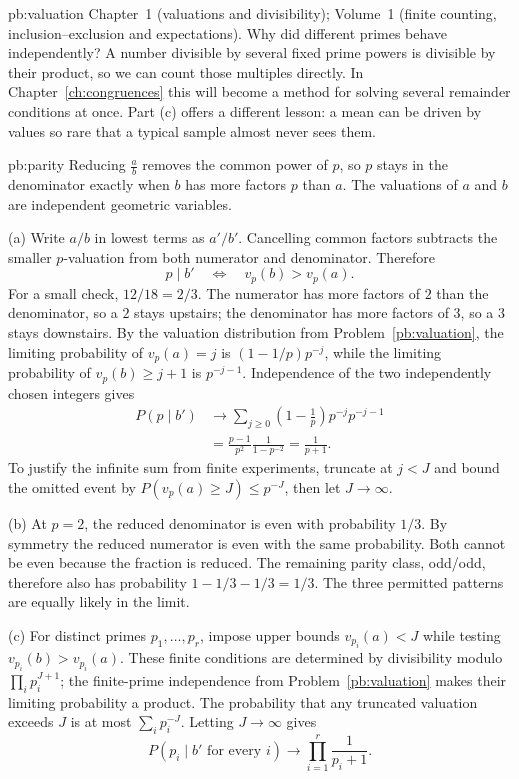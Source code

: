 \begin{solution}{pb:valuation}
\tools Chapter~1 (valuations and divisibility); Volume~1 (finite counting, inclusion--exclusion and expectations).
\leads Why did different primes behave independently? A number divisible by
several fixed prime powers is divisible by their product, so we can
count those multiples directly. In Chapter~\ref{ch:congruences} this
will become a method for solving several remainder conditions at once.
Part (c) offers a different lesson: a mean can be driven by values
so rare that a typical sample almost never sees them.
\end{solution}

\begin{solution}{pb:parity}
\idea Reducing $\frac ab$ removes the common power of $p$, so $p$ stays in the denominator exactly when $b$ has more factors $p$
than $a$. The valuations of $a$ and $b$ are independent geometric variables.

\writeup (a) Write $a/b$ in lowest terms as $a'/b'$. Cancelling common factors subtracts the smaller $p$-valuation from both numerator and denominator. Therefore
\[
p\mid b'\quad\Longleftrightarrow\quad v_p(b)>v_p(a).
\]
For a small check, $12/18=2/3$. The numerator has more factors of $2$ than the denominator, so a $2$ stays upstairs; the denominator has more factors of $3$, so a $3$ stays downstairs.
By the valuation distribution from Problem~\ref{pb:valuation}, the limiting probability of $v_p(a)=j$ is $(1-1/p)p^{-j}$, while the limiting probability of $v_p(b)\ge j+1$ is $p^{-j-1}$. Independence of the two independently chosen integers gives
\[
\begin{aligned}
P(p\mid b')
&\longrightarrow
\sum_{j\ge0}\left(1-\frac1p\right)p^{-j}p^{-j-1}\\
&=\frac{p-1}{p^2}\frac1{1-p^{-2}}
=\frac1{p+1}.
\end{aligned}
\]
To justify the infinite sum from finite experiments, truncate at $j<J$ and bound the omitted event by $P(v_p(a)\ge J)\le p^{-J}$, then let $J\to\infty$.

(b) At $p=2$, the reduced denominator is even with probability $1/3$. By symmetry the reduced numerator is even with the same probability. Both cannot be even because the fraction is reduced. The remaining parity class, odd/odd, therefore also has probability $1-1/3-1/3=1/3$. The three permitted patterns are equally likely in the limit.

(c) For distinct primes $p_1,\ldots,p_r$, impose upper bounds $v_{p_i}(a)<J$ while testing $v_{p_i}(b)>v_{p_i}(a)$. These finite conditions are determined by divisibility modulo $\prod_i p_i^{J+1}$; the finite-prime independence from Problem~\ref{pb:valuation} makes their limiting probability a product. The probability that any truncated valuation exceeds $J$ is at most $\sum_i p_i^{-J}$. Letting $J\to\infty$ gives
\[
P(p_i\mid b'\text{ for every }i)\longrightarrow
\prod_{i=1}^r\frac1{p_i+1}.
\]


\end{solution}
